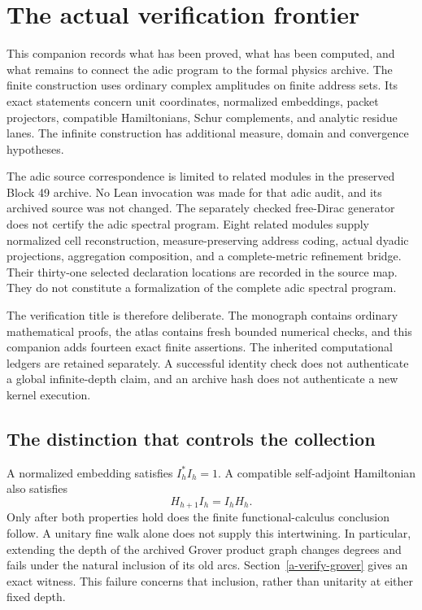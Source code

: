 \section{The actual verification frontier}\label{a-verify-frontier}

This companion records what has been proved, what has been computed, and what remains to connect the adic program to the formal physics archive. The finite construction uses ordinary complex amplitudes on finite address sets. Its exact statements concern unit coordinates, normalized embeddings, packet projectors, compatible Hamiltonians, Schur complements, and analytic residue lanes. The infinite construction has additional measure, domain and convergence hypotheses.

The adic source correspondence is limited to related modules in the preserved Block 49 archive. No Lean invocation was made for that adic audit, and its archived source was not changed. The separately checked free-Dirac generator does not certify the adic spectral program. Eight related modules supply normalized cell reconstruction, measure-preserving address coding, actual dyadic projections, aggregation composition, and a complete-metric refinement bridge. Their thirty-one selected declaration locations are recorded in the source map. They do not constitute a formalization of the complete adic spectral program.

The verification title is therefore deliberate. The monograph contains ordinary mathematical proofs, the atlas contains fresh bounded numerical checks, and this companion adds fourteen exact finite assertions. The inherited computational ledgers are retained separately. A successful identity check does not authenticate a global infinite-depth claim, and an archive hash does not authenticate a new kernel execution.

\subsection{The distinction that controls the collection}

A normalized embedding satisfies \(I_h^*I_h=1\). A compatible self-adjoint Hamiltonian also satisfies
\[
 H_{h+1}I_h=I_hH_h.
\]
Only after both properties hold does the finite functional-calculus conclusion follow. A unitary fine walk alone does not supply this intertwining. In particular, extending the depth of the archived Grover product graph changes degrees and fails under the natural inclusion of its old arcs. Section~\ref{a-verify-grover} gives an exact witness. This failure concerns that inclusion, rather than unitarity at either fixed depth.

